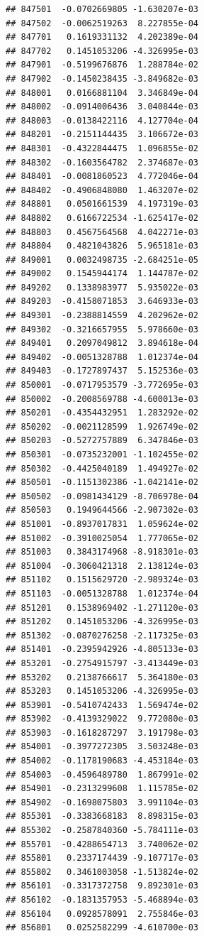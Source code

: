 \begin{frame}[fragile]
\begin{verbatim}
## 847501  -0.0702669805 -1.630207e-03
## 847502  -0.0062519263  8.227855e-04
## 847701   0.1619331132  4.202389e-04
## 847702   0.1451053206 -4.326995e-03
## 847901  -0.5199676876  1.288784e-02
## 847902  -0.1450238435 -3.849682e-03
## 848001   0.0166881104  3.346849e-04
## 848002  -0.0914006436  3.040844e-03
## 848003  -0.0138422116  4.127704e-04
## 848201  -0.2151144435  3.106672e-03
## 848301  -0.4322844475  1.096855e-02
## 848302  -0.1603564782  2.374687e-03
## 848401  -0.0081860523  4.772046e-04
## 848402  -0.4906848080  1.463207e-02
## 848801   0.0501661539  4.197319e-03
## 848802   0.6166722534 -1.625417e-02
## 848803   0.4567564568  4.042271e-03
## 848804   0.4821043826  5.965181e-03
## 849001   0.0032498735 -2.684251e-05
## 849002   0.1545944174  1.144787e-02
## 849202   0.1338983977  5.935022e-03
## 849203  -0.4158071853  3.646933e-03
## 849301  -0.2388814559  4.202962e-02
## 849302  -0.3216657955  5.978660e-03
## 849401   0.2097049812  3.894618e-04
## 849402  -0.0051328788  1.012374e-04
## 849403  -0.1727897437  5.152536e-03
## 850001  -0.0717953579 -3.772695e-03
## 850002  -0.2008569788 -4.600013e-03
## 850201  -0.4354432951  1.283292e-02
## 850202  -0.0021128599  1.926749e-02
## 850203  -0.5272757889  6.347846e-03
## 850301  -0.0735232001 -1.102455e-02
## 850302  -0.4425040189  1.494927e-02
## 850501  -0.1151302386 -1.042141e-02
## 850502  -0.0981434129 -8.706978e-04
## 850503   0.1949644566 -2.907302e-03
## 851001  -0.8937017831  1.059624e-02
## 851002  -0.3910025054  1.777065e-02
## 851003   0.3843174968 -8.918301e-03
## 851004  -0.3060421318  2.138124e-03
## 851102   0.1515629720 -2.989324e-03
## 851103  -0.0051328788  1.012374e-04
## 851201   0.1538969402 -1.271120e-03
## 851202   0.1451053206 -4.326995e-03
## 851302  -0.0870276258 -2.117325e-03
## 851401  -0.2395942926 -4.805133e-03
## 853201  -0.2754915797 -3.413449e-03
## 853202   0.2138766617  5.364180e-03
## 853203   0.1451053206 -4.326995e-03
## 853901  -0.5410742433  1.569474e-02
## 853902  -0.4139329022  9.772080e-03
## 853903  -0.1618287297  3.191798e-03
## 854001  -0.3977272305  3.503248e-03
## 854002  -0.1178190683 -4.453184e-03
## 854003  -0.4596489780  1.867991e-02
## 854901  -0.2313299608  1.115785e-02
## 854902  -0.1698075803  3.991104e-03
## 855301  -0.3383668183  8.898315e-03
## 855302  -0.2587840360 -5.784111e-03
## 855701  -0.4288654713  3.740062e-02
## 855801   0.2337174439 -9.107717e-03
## 855802   0.3461003058 -1.513824e-02
## 856101  -0.3317372758  9.892301e-03
## 856102  -0.1831357953 -5.468894e-03
## 856104   0.0928578091  2.755846e-03
## 856801   0.0252582299 -4.610700e-03

\end{verbatim}
\end{frame}
